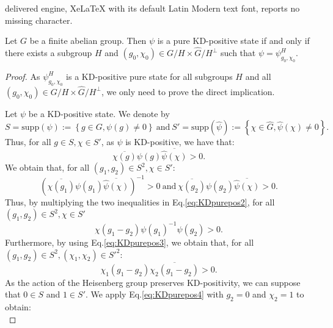 \documentclass[10pt,a4paper]{amsart}
\begin{document}
delivered engine, XeLaTeX with its default Latin Modern text font, reports no missing character.
\begin{Theorem}\label{thm:KDPure}
     Let $G$ be a finite abelian group. Then $\psi$ is a pure KD-positive state if and only if there exists a subgroup $H$ and $(g_0,\chi_0)\in G/H \times\hat{G}/H^{\perp}$ such that $\psi = \psi^{H}_{g_0,\chi_0}$.
 \end{Theorem}

\begin{proof}
    As $\psi^{H}_{g_0,\chi_0}$ is a KD-positive pure state for all subgroups $H$ and all $(g_0,\chi_0)\in G/H \times\hat{G}/H^{\perp}$, we only need to prove the direct implication. 
    
    Let $\psi$ be a KD-positive state. We denote by 
    \begin{equation}
        S=\mathrm{supp}(\psi):= \left\{g\in G, \psi(g) \neq 0\right\} \mathrm{\ and \ } S' = \mathrm{supp}(\hat{\psi}):= \left\{\chi\in \hat{G}, \hat{\psi}(\chi) \neq 0\right\}.
    \end{equation}
    Thus, for all $g\in S, \chi \in S'$, as $\psi$ is KD-positive, we have that:
    \begin{equation}\label{eq:KDpurepos1}
        \overline{\chi(g)}\psi(g)\overline{\hat{\psi}(\chi)} >0.
    \end{equation}
    We obtain that, for all $(g_1,g_2)\in S^2, \chi \in S'$:
    \begin{equation}\label{eq:KDpurepos2}
        \left(\overline{\chi(g_1)}\psi(g_1)\overline{\hat{\psi}(\chi)}\right)^{-1} >0 \mathrm{ \ and \ } \overline{\chi(g_2)}\psi(g_2)\overline{\hat{\psi}(\chi)} > 0.
    \end{equation}
    Thus, by multiplying the two inequalities in Eq.\eqref{eq:KDpurepos2}, for all $(g_1,g_2)\in S^2, \chi \in S'$
    \begin{equation}\label{eq:KDpurepos3}
        \chi(g_1-g_2)\psi(g_1)^{-1}\psi(g_2) > 0.
    \end{equation}
    Furthermore, by using Eq.\eqref{eq:KDpurepos3}, we obtain that, for all $(g_1,g_2)\in S^2, (\chi_1,\chi_2) \in S'^{2}$:
    \begin{equation}\label{eq:KDpurepos4}
        \chi_{1}(g_1-g_2)\overline{\chi_{2}(g_1-g_2)} > 0.
    \end{equation}
    As the action of the Heisenberg group preserves KD-positivity, we can suppose that $0\in S$ and $1\in S'$. We apply Eq.\eqref{eq:KDpurepos4} with $g_2=0$ and $\chi_2=1$ to obtain:
    \begin{equation}\label{eq:KDpurepos5}

\end{equation}
\end{proof}
\end{document}
